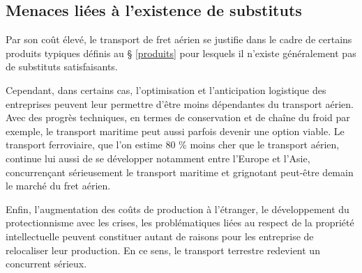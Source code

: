 \subsection{Menaces liées à l'existence de substituts}
\label{substituts}

Par son coût élevé, le transport de fret aérien se justifie dans le cadre de certains produits typiques définis au § \ref{produits} pour lesquels il n'existe généralement pas de substituts satisfaisants.

Cependant, dans certains cas, l'optimisation et l'anticipation logistique des entreprises peuvent leur permettre d'être moins dépendantes du transport aérien. Avec des progrès techniques, en termes de conservation et de chaîne du froid par exemple, le transport maritime peut aussi parfois devenir une option viable. Le transport ferroviaire, que l'on estime 80 \% moins cher que le transport aérien, continue lui aussi de se développer notamment entre l'Europe et l'Asie, concurrençant sérieusement le transport maritime et grignotant peut-être demain le marché du fret aérien. \cite{lemonde_train}

Enfin, l'augmentation des coûts de production à l'étranger, le développement du protectionnisme avec les crises, les problématiques liées au respect de la propriété intellectuelle peuvent constituer autant de raisons pour les entreprise de relocaliser leur production. En ce sens, le transport terrestre redevient un concurrent sérieux. 
